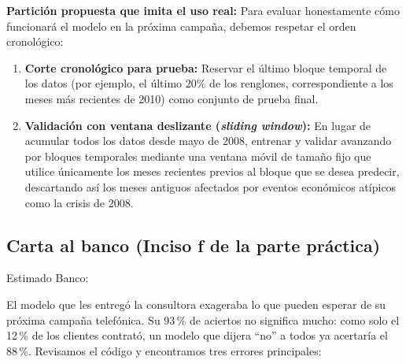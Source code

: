 \documentclass[11pt, letterpaper]{article}
\begin{document}
\textbf{Partición propuesta que imita el uso real:} Para evaluar honestamente cómo funcionará el modelo en la próxima campaña, debemos respetar el orden cronológico:
\begin{enumerate}
    \item \textbf{Corte cronológico para prueba:} Reservar el último bloque temporal de los datos (por ejemplo, el último $20\%$ de los renglones, correspondiente a los meses más recientes de 2010) como conjunto de prueba final.
    \item \textbf{Validación con ventana deslizante (\emph{sliding window}):} En lugar de acumular todos los datos desde mayo de 2008, entrenar y validar avanzando por bloques temporales mediante una ventana móvil de tamaño fijo que utilice únicamente los meses recientes previos al bloque que se desea predecir, descartando así los meses antiguos afectados por eventos económicos atípicos como la crisis de 2008.
\end{enumerate}

\clearpage
\subsection{Carta al banco (Inciso f de la parte práctica)}
\noindent Estimado Banco:

\medskip
\noindent El modelo que les entregó la consultora exageraba lo que pueden esperar de su próxima campaña telefónica. Su 93\,\% de aciertos no significa mucho: como solo el 12\,\% de los clientes contrató, un modelo que dijera ``no'' a todos ya acertaría el 88\,\%. Revisamos el código y encontramos tres errores principales:
\end{document}

